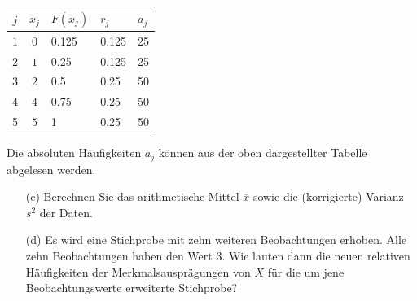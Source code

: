 \begin{table}[H]
\centering
\begin{tabular}{c|clll}
    $j$ & $x_j$ & $F(x_j)$ & $r_j$ & $a_j$ \\ \hline
    1   & $0$   & 0.125    & 0.125 & 25    \\
    2   & $1$   & 0.25     & 0.125 & 25    \\
    3   & $2$   & 0.5      & 0.25  & 50    \\
    4   & $4$   & 0.75     & 0.25  & 50    \\
    5   & $5$   & 1        & 0.25  & 50    \\
\end{tabular}
\end{table}

Die absoluten Häufigkeiten $a_j$ können aus der oben dargestellter Tabelle abgelesen werden.

\begin{task}
    \begin{enumerate}
        \item[(c)] Berechnen Sie das arithmetische Mittel $\overline{x}$ sowie die (korrigierte) Varianz $s^2$ der Daten.
    \end{enumerate}
\end{task}

\begin{task}
    \begin{enumerate}
        \item[(d)] Es wird eine Stichprobe mit zehn weiteren Beobachtungen erhoben. Alle zehn Beobachtungen haben den Wert $3$. Wie lauten dann die neuen relativen Häufigkeiten der Merkmalsausprägungen von $X$ für die um jene Beobachtungswerte erweiterte Stichprobe?
    \end{enumerate}
\end{task}
